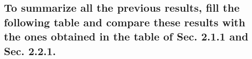 \documentclass[twocolumn,letterpaper]{report}
\begin{document}
{			\subsection{To summarize all the previous results, fill the following table and compare these results with the ones obtained in the table of Sec. 2.1.1 and Sec. 2.2.1.}
}
\end{document}
